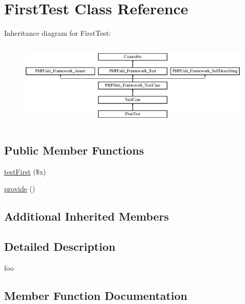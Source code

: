 \hypertarget{class_foo_1_1_data_provider_issue2922_1_1_first_test}{}\section{First\+Test Class Reference}
\label{class_foo_1_1_data_provider_issue2922_1_1_first_test}
Inheritance diagram for First\+Test\+:\begin{figure}[H]
\begin{center}
\leavevmode
\includegraphics[height=4.129793cm]{class_foo_1_1_data_provider_issue2922_1_1_first_test}
\end{center}
\end{figure}
\subsection*{Public Member Functions}
\begin{DoxyCompactItemize}
\item 
\mbox{\hyperlink{class_foo_1_1_data_provider_issue2922_1_1_first_test_af8ab67a72789da589982c3966d8642ef}{test\+First}} (\$x)
\item 
\mbox{\hyperlink{class_foo_1_1_data_provider_issue2922_1_1_first_test_a70dcc3876ac2d22d8895b012ccd46daf}{provide}} ()
\end{DoxyCompactItemize}
\subsection*{Additional Inherited Members}


\subsection{Detailed Description}
foo 

\subsection{Member Function Documentation}
\mbox{\label{class_foo_1_1_data_provider_issue2922_1_1_first_test_a70dcc3876ac2d22d8895b012ccd46daf}} 
